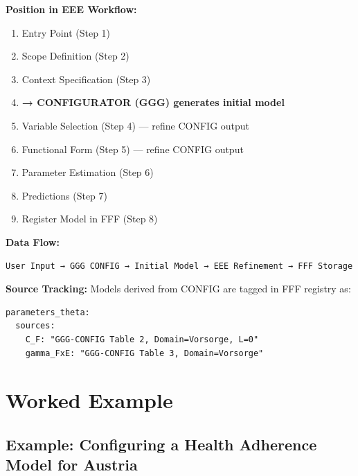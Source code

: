 \begin{tcolorbox}[colback=yellow!5!white, colframe=yellow!75!black,
    title=Integration: METHOD-CONFIG in the Workflow]

\textbf{Position in EEE Workflow:}
\begin{enumerate}
\item Entry Point (Step 1)
\item Scope Definition (Step 2)
\item Context Specification (Step 3)
\item \textbf{→ CONFIGURATOR (GGG) generates initial model}
\item Variable Selection (Step 4) --- refine CONFIG output
\item Functional Form (Step 5) --- refine CONFIG output
\item Parameter Estimation (Step 6)
\item Predictions (Step 7)
\item Register Model in FFF (Step 8)
\end{enumerate}

\textbf{Data Flow:}
\begin{verbatim}
User Input → GGG CONFIG → Initial Model → EEE Refinement → FFF Storage
\end{verbatim}

\textbf{Source Tracking:}
Models derived from CONFIG are tagged in FFF registry as:
\begin{verbatim}
parameters_theta:
  sources:
    C_F: "GGG-CONFIG Table 2, Domain=Vorsorge, L=0"
    gamma_FxE: "GGG-CONFIG Table 3, Domain=Vorsorge"
\end{verbatim}
\end{tcolorbox}



\section{Worked Example}
\label{sec:ggg-example}

\subsection{Example: Configuring a Health Adherence Model for Austria}

